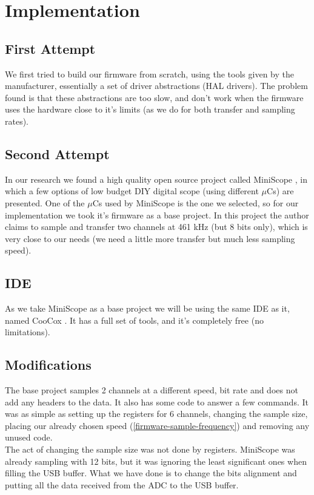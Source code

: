 \section{Implementation}
\label{firmware-implementation}

\subsection{First Attempt}
We first tried to build our firmware from scratch, using the tools given by the
manufacturer, essentially a set of driver abstractions (HAL drivers). The problem
found is that these abstractions are too slow, and don't work when the firmware
uses the hardware close to it's limits (as we do for both transfer and sampling rates).

\subsection{Second Attempt}
In our research we found a high quality open source project called MiniScope \cite{MiniScope},
in which a few options of low budget DIY digital scope (using different $\mu$Cs) are
presented. One of the $\mu$Cs used by MiniScope is the one we selected, so for our
implementation we took it's firmware as a base project. In this project the author
claims to sample and transfer two channels at 461 kHz (but 8 bits only), which is
very close to our needs (we need a little more transfer but much less sampling speed).

\subsection{IDE}
As we take MiniScope as a base project we will be using the same IDE as it, named
CooCox \cite{CooCox}. It has a full set of tools, and it's completely free (no limitations).

\subsection{Modifications}
The base project samples 2 channels at a different speed, bit rate and does not
add any headers to the data. It also has some code to answer a few commands. It
was as simple as setting up the registers for 6 channels, changing the sample size,
placing our already chosen speed (\autoref{firmware-sample-frequency}) and removing
any unused code. \\
The act of changing the sample size was not done by registers. MiniScope was already
sampling with 12 bits, but it was ignoring the least significant ones when filling
the USB buffer. What we have done is to change the bits alignment and putting all
the data received from the ADC to the USB buffer.

